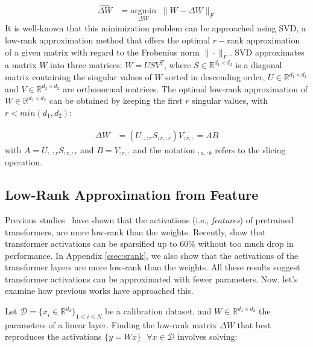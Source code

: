 \documentclass[11pt]{article}
\begin{document}
\begingroup
\setlength{\abovedisplayskip}{0pt}
\setlength{\belowdisplayskip}{3pt}
{\small{
\begin{align}
    \label{eq:lr_weight}
    \widehat{\Delta W} &= \underset{{\Delta W}}{\mathrm{argmin}} \;\; \|W - {\Delta W}\|_{F}
\end{align}
}}
\endgroup
It is well-known that this minimization problem can be approached using SVD, a low-rank approximation method that offers the optimal $r-$rank approximation of a given matrix with regard to the Frobenius norm $\|\cdot\|_{F}$.
SVD approximates a matrix $W$ into three matrices: $W = USV^{T}$, where $S\in \mathbb{R}^{d_{1} \times d_{2}}$ is a diagonal matrix containing the singular values of $W$ sorted in descending order, $U \in \mathbb{R}^{d_{1} \times d_{1}}$ and $V \in \mathbb{R}^{d_{2} \times d_{2}}$ are orthonormal matrices. The optimal low-rank approximation of $W \in \mathbb{R}^{d_{1} \times d_{2}}$ can be obtained by keeping the first $r$ singular values, with $r < min(d_{1}, d_{2})$:

\begingroup
\setlength{\abovedisplayskip}{0pt}
\setlength{\belowdisplayskip}{3pt}
{\small{
\begin{align}
    \label{eq:svd}
    \widehat{\Delta W} &= (U_{:, :r}S_{:r, :r})V_{:r,:} = AB
\end{align}
}}
\endgroup
with $A=U_{:,:r}S_{:r,:r}$ and $B=V_{:r,:}$ and the notation $_{:a, :b}$ refers to the slicing operation. 

\subsection{Low-Rank Approximation from Feature}
\label{ssec:pca}

Previous studies~\citep{chen_drone, yu_compressing_2023} have shown that the activations (i.e., \textit{features}) of pretrained transformers, are more low-rank than the weights. Recently, \citet{TEAL} show that transformer activations can be sparsified up to 60\% without too much drop in performance. In Appendix \ref{ssec:srank}, we also show that the activations of the transformer layers are more low-rank than the weights. All these results suggest transformer activations can be approximated with fewer parameters. Now, let's examine how previous works \citep{kaushal_lord_2023, chen_drone, yu_compressing_2023} have approached this.

Let $\mathcal{D} = \{x_i \in \mathbb{R}^{d_{2}}\}_{1\leq i\leq N}$ be a calibration dataset,
and $W \in \mathbb{R}^{d_{1} \times d_{2}}$ the parameters of a linear layer.
Finding the low-rank matrix $\Delta W$ that best reproduces the activations $\{y=Wx\}~~~ \forall x\in \mathcal{D}$ involves solving:
\end{document}
